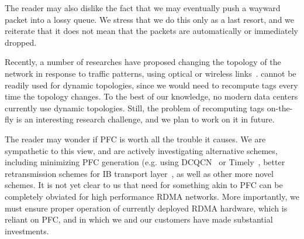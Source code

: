 The reader may also dislike the fact that we may eventually push a wayward
packet into a lossy queue. We stress that we do this only as a last resort, and
we reiterate that it does not mean that the packets are automatically or
immediately dropped. 

 Recently, a number of researches have proposed
changing the topology of the network in response to traffic patterns, using
optical or wireless links~\cite{helios,flyways,projector,mirrormirror}.
\sysname{} cannot be readily used for dynamic topologies, since we would need to
recompute tags every time the topology changes. To the best of our knowledge, no
modern data centers currently use dynamic topologies. Still, the problem of
recomputing tags on-the-fly is an interesting research challenge, and we plan to
work on it in future.

 The reader may wonder if PFC is worth all the trouble
it causes. We are sympathetic to this view, and are actively investigating
alternative schemes, including minimizing PFC generation (e.g.  using
DCQCN~\cite{dcqcn} or Timely~\cite{timely}, better retransmission schemes for IB
transport layer~\cite{xxx}, as well as other more novel schemes.  It is not yet
clear to us that need for something akin to PFC can be completely obviated for
high performance RDMA networks. More importantly, we must ensure proper
operation of currently deployed RDMA hardware, which is reliant on PFC, and in
which we and our customers have made substantial investments.

